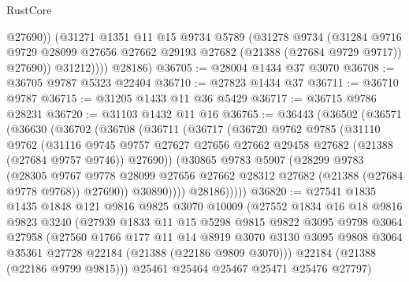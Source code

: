 \begin{lexlean}{RustCore}
\begin{coremodule}
                @27690))
            (@31271
              @1351
              @11
              @15
              @9734
              @5789
              (@31278
                @9734
                (@31284
                  @9716
                  @9729
                  @28099
                  @27656
                  @27662
                  @29193
                  @27682
                  (@21388 (@27684 @9729 @9717))
                  @27690))
              @31212))))
      @28186)
@36705 := @28004 @1434 @37 @3070
@36708 := @36705 @9787 @5323 @22404
@36710 := @27823 @1434 @37
@36711 := @36710 @9787
@36715 := @31205 @1433 @11 @36 @5429
@36717 := @36715 @9786 @28231
@36720 := @31103 @1432 @11 @16
@36765 := @36443
    (@36502
      (@36571
        (@36630
          (@36702
            (@36708
              (@36711
                (@36717
                  (@36720
                    @9762
                    @9785
                    (@31110
                      @9762
                      (@31116
                        @9745
                        @9757
                        @27627
                        @27656
                        @27662
                        @29458
                        @27682
                        (@21388 (@27684 @9757 @9746))
                        @27690))
                    (@30865
                      @9783
                      @5907
                      (@28299
                        @9783
                        (@28305
                          @9767
                          @9778
                          @28099
                          @27656
                          @27662
                          @28312
                          @27682
                          (@21388 (@27684 @9778 @9768))
                          @27690))
                      @30890))))
              @28186)))))
@36820 := @27541
    @1835
    @1435
    @1848
    @121
    @9816
    @9825
    @3070
    @10009
    (@27552
      @1834
      @16
      @18
      @9816
      @9823
      @3240
      (@27939
        @1833
        @11
        @15
        @5298
        @9815
        @9822
        @3095
        @9798
        @3064
        @27958
        (@27560
          @1766
          @177
          @11
          @14
          @8919
          @3070
          @3130
          @3095
          @9808
          @3064
          @35361
          @27728
          @22184
          (@21388 (@22186 @9809 @3070)))
        @22184
        (@21388 (@22186 @9799 @9815)))
      @25461
      @25464
      @25467
      @25471
      @25476
      @27797)

\end{coremodule}
\end{lexlean}
